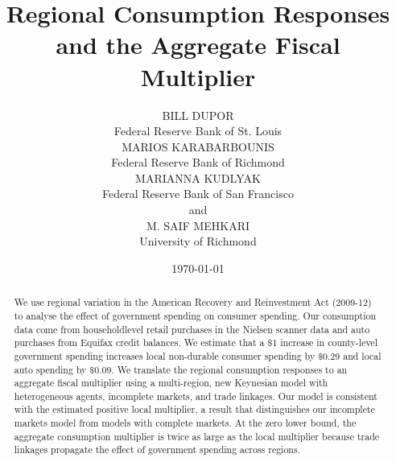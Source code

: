 \documentclass[\latexroot/\projectname]{subfiles}
\begin{document}
\webonly{
  \newcommand{\versn}{Web}
}

\title{Regional Consumption
Responses and the Aggregate
Fiscal Multiplier}

\author{BILL DUPOR\\
Federal Reserve Bank of St. Louis\\
MARIOS KARABARBOUNIS\\
Federal Reserve Bank of Richmond\\
MARIANNA KUDLYAK\\
Federal Reserve Bank of San Francisco\\
and\\
M. SAIF MEHKARI\\
University of Richmond}



\date{\today}

\maketitle
\vspace{-0.5\baselineskip}

\whenintegrated{\label{abstract}} %

\begin{abstract}
  We use regional variation in the American Recovery and Reinvestment Act (2009-12) to analyse the effect of government spending on consumer spending. Our consumption data come from householdlevel retail purchases in the Nielsen scanner data and auto purchases from Equifax credit balances. We estimate that a $\$ 1$ increase in county-level government spending increases local non-durable consumer spending by $\$ 0.29$ and local auto spending by $\$ 0.09$. We translate the regional consumption responses to an aggregate fiscal multiplier using a multi-region, new Keynesian model with heterogeneous agents, incomplete markets, and trade linkages. Our model is consistent with the estimated positive local multiplier, a result that distinguishes our incomplete markets model from models with complete markets. At the zero lower bound, the aggregate consumption multiplier is twice as large as the local multiplier because trade linkages propagate the effect of government spending across regions.
\end{abstract}
\vspace{-0.5\baselineskip}
\end{document}
